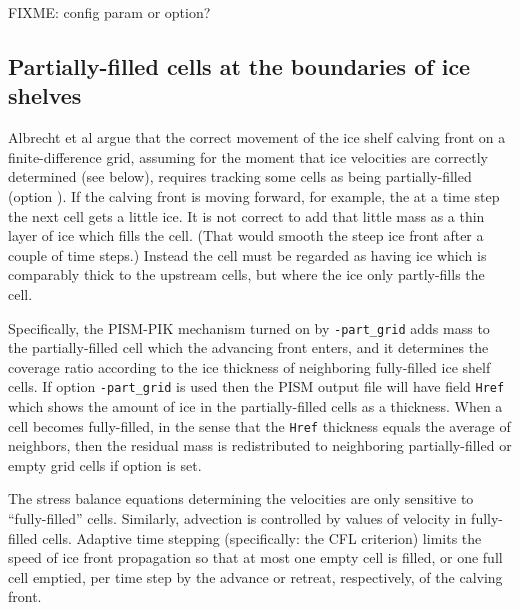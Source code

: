 FIXME: config param or option?


\subsection{Partially-filled cells at the boundaries of ice shelves}
\label{sec:part-grid}
Albrecht et al \cite{Albrechtetal2011} argue that the correct movement of the ice shelf calving front on a finite-difference grid, assuming for the moment that ice velocities are correctly determined (see below), requires tracking some cells as being partially-filled (option ).  If the calving front is moving forward, for example, the at a time step the next cell gets a little ice.  It is not correct to add that little mass as a thin layer of ice which fills the cell.  (That would smooth the steep ice front after a couple of time steps.)  Instead the cell must be regarded as having ice which is comparably thick to the upstream cells, but where the ice only partly-fills the cell.

Specifically, the PISM-PIK mechanism turned on by \texttt{-part_grid} adds mass to the partially-filled cell which the advancing front enters, and it determines the coverage ratio according to the ice thickness of neighboring fully-filled ice shelf cells.  If option \texttt{-part_grid} is used then the PISM output file will have field \texttt{Href} which shows the amount of ice in the partially-filled cells as a thickness.  When a cell becomes fully-filled, in the sense that the \texttt{Href} thickness equals the average of neighbors, then the residual mass is redistributed to neighboring partially-filled or empty grid cells if option  is set.

The stress balance equations determining the velocities are only sensitive to ``fully-filled'' cells.  Similarly, advection is controlled by values of velocity in fully-filled cells.  Adaptive time stepping (specifically: the CFL criterion) limits the speed of ice front propagation so that at most one empty cell is filled, or one full cell emptied, per time step by the advance or retreat, respectively, of the calving front.

